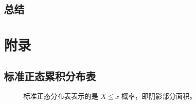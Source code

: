 \documentclass[letterpaper,10pt,english]{sphinxmanual}
\begin{document}
\section{总结}
\label{\detokenize{_u6709_u5e8f_u79bb_u6563_u6a21_u578b/content:id5}}

\chapter{附录}
\label{\detokenize{_u9644_u5f55/_u5206_u5e03_u8868:id1}}\label{\detokenize{_u9644_u5f55/_u5206_u5e03_u8868::doc}}

\section{标准正态累积分布表}
\label{\detokenize{_u9644_u5f55/_u5206_u5e03_u8868:id2}}
\begin{figure}[htbp]
\centering
\capstart

\noindent{}
\caption{标准正态分布表表示的是 \(X \leq x\) 概率，即阴影部分面积。}\label{\detokenize{_u9644_u5f55/_u5206_u5e03_u8868:id4}}\label{\detokenize{_u9644_u5f55/_u5206_u5e03_u8868:pic-002}}
\begin{sphinxlegend}\end{sphinxlegend}
\end{figure}
\end{document}
